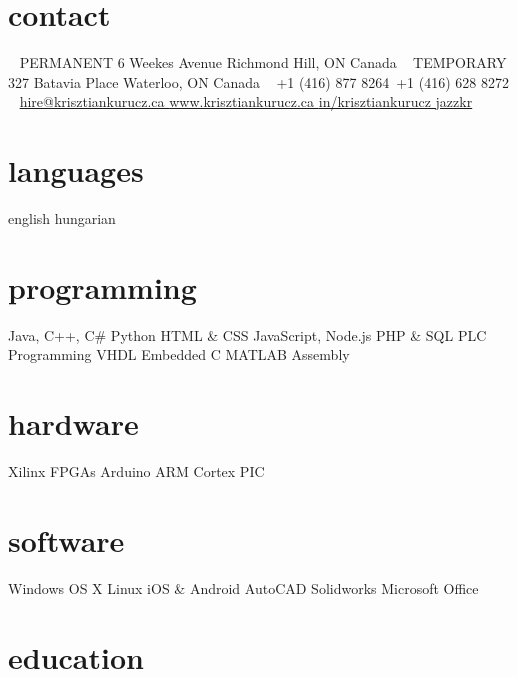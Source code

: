\documentclass[hidelinks]{kkurucz-cv}
\begin{document}


\begin{aside} %
\section{contact}
~
{\headingfont PERMANENT}
6 Weekes Avenue
Richmond Hill, ON
Canada
~
{\headingfont TEMPORARY}
327 Batavia Place
Waterloo, ON
Canada
~
{+1 (416) 877 8264\hspace{1.5mm}\mobile}\,
{+1 (416) 628 8272 \phone}
~
\href{mailto:hire@krisztiankurucz.ca}{hire@krisztiankurucz.ca }\mail
\href{http://www.krisztiankurucz.ca}{www.krisztiankurucz.ca }\website
\href{http://ca.linkedin.com/in/krisztiankurucz}{in/krisztiankurucz }\linkedin
\href{http://www.github.com/jazzkr}{jazzkr }\github
\section{languages}
english
hungarian
\section{programming}
Java, C++, C\#
Python
HTML \& CSS
JavaScript, Node.js
PHP \& SQL
PLC Programming
VHDL
Embedded C
MATLAB
Assembly
\section{hardware}
Xilinx FPGAs
Arduino
ARM Cortex
PIC
\section{software}
Windows
OS X
Linux
iOS \& Android
AutoCAD
Solidworks
Microsoft Office
\end{aside}


\section{education}
\end{document}
